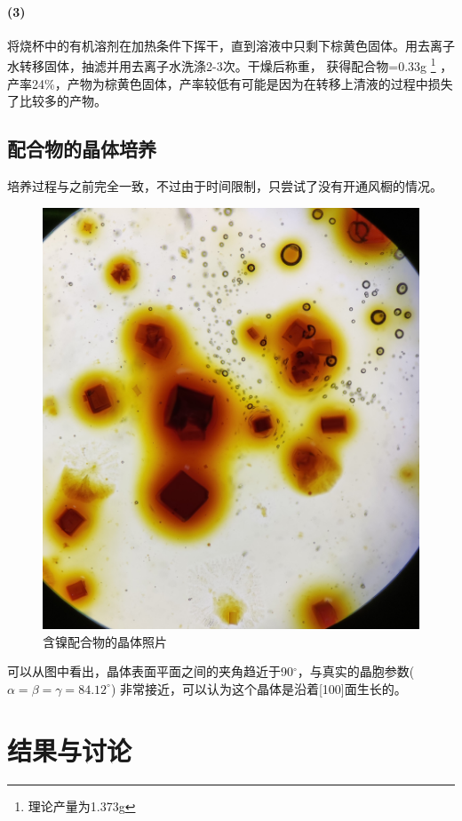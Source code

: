 \documentclass[a4paper,zihao=5,UTF8]{ctexart}
\def\degree{$^{\circ}$}
\begin{document}
	\paragraph{(3)}
	将烧杯中的有机溶剂在加热条件下挥干，直到溶液中只剩下棕黄色固体。用去离子水转移固体，抽滤并用去离子水洗涤2-3次。干燥后称重，
	获得配合物=0.33g
	\footnote{理论产量为1.373g}
	，产率24\%，产物为棕黄色固体，产率较低有可能是因为在转移上清液的过程中损失了比较多的产物。
	\subsection{配合物的晶体培养}
	培养过程与之前完全一致，不过由于时间限制，只尝试了没有开通风橱的情况。
	\begin{figure}[htbp]
		\centering
		\includegraphics[scale=0.1]{Ni_WCB.jpg}
		\caption{含镍配合物的晶体照片}
	\end{figure}
	可以从图中看出，晶体表面平面之间的夹角趋近于90\degree ，与真实的晶胞参数($\alpha = \beta = \gamma = 84.12^\circ$)
	非常接近，可以认为这个晶体是沿着[100]面生长的。
	\section{结果与讨论}
\end{document}
